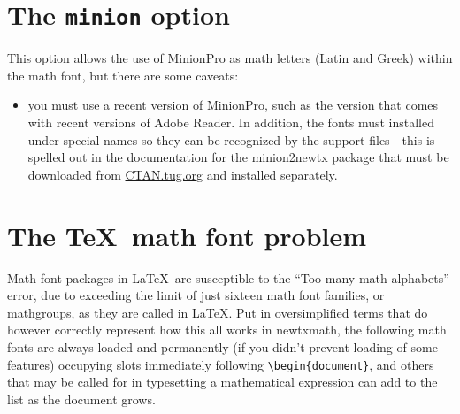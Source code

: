 \documentclass[11pt]{article}
\theoremstyle{oldplain}
\theoremstyle{plain}
\begin{document}
\section{The {\tt minion} option}
This option allows the use of MinionPro as math letters (Latin and Greek) within  the math font, but there are some caveats:
\begin{itemize}
\item
you must use a recent version of MinionPro, such as the version that comes with recent versions of Adobe Reader. In addition, the fonts must installed under special names so they can be recognized by the support files---this is spelled out in the documentation for the minion2newtx package that must be downloaded from \url{CTAN.tug.org} and installed separately.
\end{itemize}

\section{The \TeX\ math font problem}
Math font packages in \LaTeX\ are susceptible to the ``Too many math alphabets'' error, due to exceeding the limit of just sixteen math font families, or mathgroups, as they are called in \LaTeX. Put in oversimplified terms that do however correctly represent how this all works in \textsf{newtxmath}, the following math fonts are always loaded and permanently (if you didn't prevent loading of some features) occupying slots immediately following \verb|\begin{document}|, and others that may be called for in typesetting a mathematical expression can add to the list as the document grows.
\end{document}

